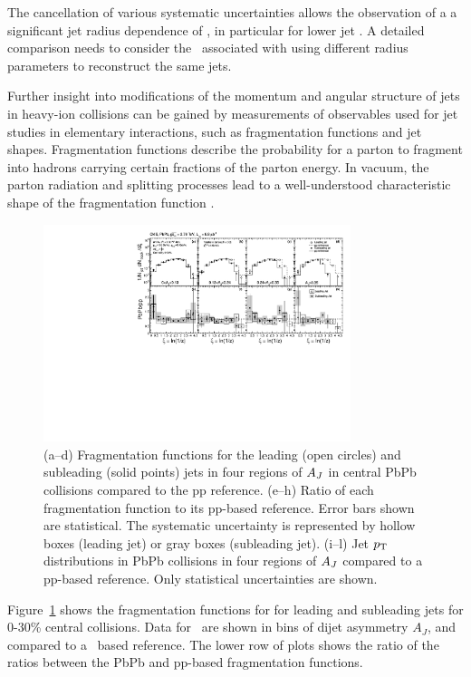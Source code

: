 The cancellation of various systematic uncertainties allows the observation of a
a significant jet radius dependence of \Rcp, in particular for
lower jet \pT. A detailed comparison needs to consider the \pT\ associated with
using different radius parameters to reconstruct the same jets.

Further insight into modifications of the momentum and angular structure
of jets in heavy-ion collisions can be gained by measurements of
observables used for jet studies in elementary interactions, such as
fragmentation functions and jet shapes.
Fragmentation functions describe the probability for a parton to fragment into
hadrons carrying certain fractions of the parton energy.
In vacuum, the parton radiation and splitting processes lead to a
well-understood characteristic shape of the fragmentation function \cite{Dokshitzer:1991wu}.

\begin{figure}[!ht]
\begin{center}
\includegraphics[width=0.8\textwidth]{jetfigures/xsi_div_both_effv9_l100s40_0to12_dphi20eta20dr3pt4id1_cwt_ppDiv_gray.pdf}
\caption{(a--d) Fragmentation functions for the leading (open circles) and subleading (solid points) jets in four regions of $A_J$ in central PbPb collisions compared to the pp reference.
(e--h) Ratio of each fragmentation function to its pp-based reference.
Error bars shown are statistical. The systematic uncertainty is
represented by hollow boxes (leading jet) or gray boxes (subleading jet).
(i--l) Jet $\mbox{$p_{\mathrm{T}}$}$ distributions in PbPb collisions in four regions of $A_J$
compared to a pp-based reference. Only statistical uncertainties are shown.
}

\label{fig:GR:CMS_jetFF}
\end{center}
\end{figure}
Figure~\ref{fig:GR:CMS_jetFF} shows the fragmentation functions for
for leading and subleading jets for 0-30\% central collisions. Data for \PbPb\ are shown in
bins of dijet asymmetry $A_J$, and compared to a \pp\ based reference.
The lower row of plots shows the ratio of the ratios between the PbPb
and pp-based fragmentation functions.

